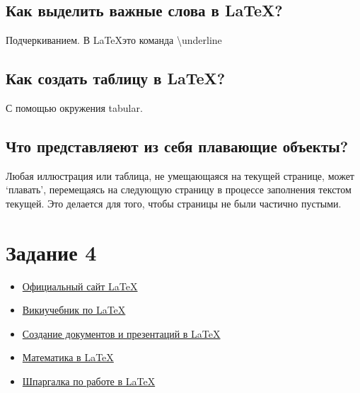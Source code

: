 \documentclass[a4paper,12pt]{article} %
\begin{document}
\subsection{Как выделить важные слова в \LaTeX?}

Подчеркиванием. В \LaTeX это команда \textbackslash underline

\subsection{Как создать таблицу в \LaTeX?}

С помощью окружения tabular.

\subsection{Что представляеют из себя плавающие объекты?}

Любая иллюстрация или таблица, не умещающаяся на текущей странице, может `плавать', перемещаясь на следующую страницу в процессе заполнения текстом текущей. Это делается для того, чтобы страницы не были частично пустыми.

\section{Задание 4}

\begin{itemize}
\item \href{https://www.latex-project.org/}{Официальный сайт \LaTeX}
\item \href{https://ru.wikibooks.org/wiki/LaTeX}{Викиучебник по \LaTeX}
\item \href{https://www.coursera.org/learn/latex}{Создание документов и презентаций в \LaTeX}
\item \href{http://www.astronet.ru/db/msg/1202050/mathmode.html}{Математика в \LaTeX}
\item \href{http://www.machinelearning.ru/wiki/index.php?title=LaTeX}{Шпаргалка по работе в \LaTeX}
\end{itemize}
\end{document}
